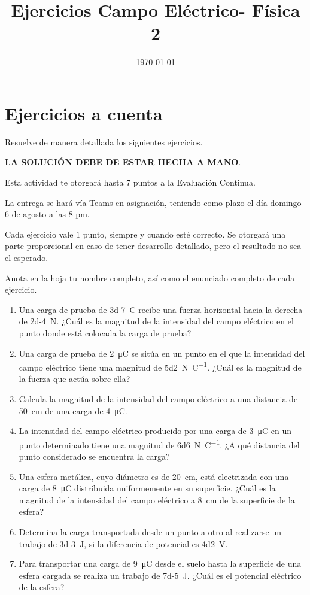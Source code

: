 \documentclass[14pt]{extarticle}
\title{\vspace*{-2cm} Ejercicios Campo Eléctrico- Física 2\vspace{-5ex}}
\date{\today}
\begin{document}
\maketitle

\section{Ejercicios a cuenta}

Resuelve de manera detallada los siguientes ejercicios.

\vspace*{0.5cm}
\textbf{LA SOLUCIÓN DEBE DE ESTAR HECHA A MANO}.

\vspace*{0.5cm}
Esta actividad te otorgará hasta  $7$ puntos a la Evaluación Continua.

La entrega se hará vía Teams en asignación, teniendo como plazo el día domingo 6 de agosto a las 8 pm.

Cada ejercicio vale $1$ punto, siempre y cuando esté correcto. Se otorgará una parte proporcional en caso de tener desarrollo detallado, pero el resultado no sea el esperado.

Anota en la hoja tu nombre completo, así como el enunciado completo de cada ejercicio.

\begin{enumerate}
\item Una carga de prueba de \SI{3d-7}{\coulomb} recibe una fuerza horizontal hacia la derecha de \SI{2d-4}{\newton}. ¿Cuál es la magnitud de la intensidad del campo eléctrico en el punto donde está colocada la carga de prueba?
\item Una carga de prueba de \SI{2}{\micro\coulomb} se sitúa en un punto en el que la intensidad del campo eléctrico tiene una magnitud de \SI{5d2}{\newton\per\coulomb}. ¿Cuál es la magnitud de la fuerza que actúa sobre ella?
\item Calcula la magnitud de la intensidad del campo eléctrico a una distancia de \SI{50}{\centi\meter} de una carga de \SI{4}{\micro\coulomb}.
\item La intensidad del campo eléctrico producido por una carga de \SI{3}{\micro\coulomb} en un punto determinado tiene una magnitud de \SI{6d6}{\newton\per\coulomb}. ¿A qué distancia del punto considerado se encuentra la carga?
\item Una esfera metálica, cuyo diámetro es de \SI{20}{\centi\meter}, está electrizada con una carga de \SI{8}{\micro\coulomb} distribuida uniformemente en su superficie. ¿Cuál es la magnitud de la intensidad del campo eléctrico a \SI{8}{\centi\meter} de la superficie de la esfera?
\item Determina la carga transportada desde un punto a otro al realizarse un trabajo de \SI{3d-3}{\joule}, si la diferencia de potencial es \SI{4d2}{\volt}.
\item Para transportar una carga de \SI{9}{\micro\coulomb} desde el suelo hasta la superficie de una esfera cargada se realiza un trabajo de \SI{7d-5}{\joule}. ¿Cuál es el potencial eléctrico de la esfera?
\end{enumerate}
\end{document}
